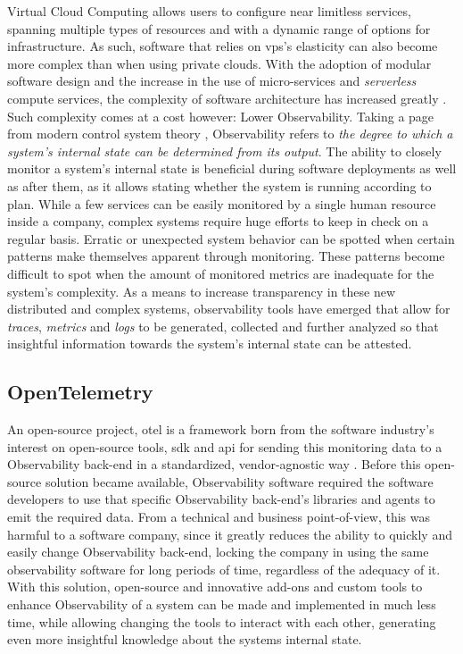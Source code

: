 Virtual Cloud Computing allows users to configure near limitless services, spanning multiple types of resources and with a dynamic range of options for infrastructure. As such, software that relies on \gls{vps}'s elasticity can also become more complex than when using private clouds. With the adoption of modular software design and the increase in the use of micro-services and \textit{serverless} compute services, the complexity of software architecture has increased greatly \Parencite{niedermaier_koetter_freymann_wagner_2019}.
Such complexity comes at a cost however: Lower Observability. Taking a page from modern control system theory \Parencite{gopal1993modern}, Observability refers to \textit{the degree to which a system's internal state can be determined from its output}. 
The ability to closely monitor a system's internal state is beneficial during software deployments as well as after them, as it allows stating whether the system is running according to plan.
While a few services can be easily monitored by a single human resource inside a company, complex systems require huge efforts to keep in check on a regular basis. 
Erratic or unexpected system behavior can be spotted when certain patterns make themselves apparent through monitoring. These patterns become difficult to spot when the amount of monitored metrics are inadequate for the system's complexity.
As a means to increase transparency in these new distributed and complex systems, observability tools have emerged that allow for \textit{traces}, \textit{metrics} and \textit{logs} to be generated, collected and further analyzed so that insightful information towards the system's internal state can be attested.

\subsection{OpenTelemetry}\label{state-of-the-art:ss:opentelemetry}

An open-source project, \gls{otel} is a framework born from the software industry's interest on open-source tools, \gls{sdk} and \gls{api} for sending this monitoring data to a Observability back-end in a standardized, vendor-agnostic way \Parencite{observability_primer_2022}. Before this open-source solution became available, Observability software required the software developers to use that specific Observability back-end's libraries and agents to emit the required data. From a technical and business point-of-view, this was harmful to a software company, since it greatly reduces the ability to quickly and easily change Observability back-end, locking the company in using the same observability software for long periods of time, regardless of the adequacy of it.
With this solution, open-source and innovative add-ons and custom tools to enhance Observability of a system can be made and implemented in much less time, while allowing changing the tools to interact with each other, generating even more insightful knowledge about the systems internal state.

